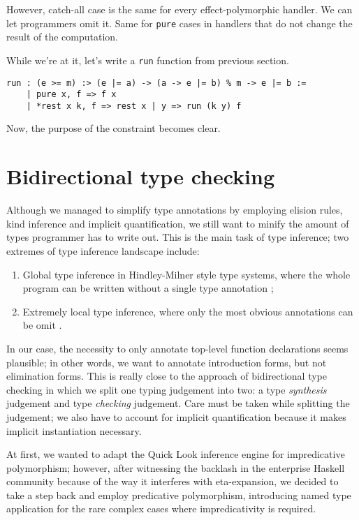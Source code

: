 \documentclass[a4paper,14pt]{extreport}
\begin{document}
However, catch-all case is the same for every effect-polymorphic handler. We can
let programmers omit it. Same for \verb|pure| cases in handlers that do not
change the result of the computation.

While we're at it, let's write a \verb|run| function from previous section.

\begin{verbatim}
run : (e >= m) :> (e |= a) -> (a -> e |= b) % m -> e |= b :=
    | pure x, f => f x
    | *rest x k, f => rest x | y => run (k y) f
\end{verbatim}

Now, the purpose of the constraint becomes clear.

\section{Bidirectional type checking}

Although we managed to simplify type annotations by employing elision rules,
kind inference and implicit quantification, we still want to minify the amount
of types programmer has to write out. This is the main task of type inference;
two extremes of type inference landscape include:

\begin{enumerate}
    \item Global type inference in Hindley-Milner style type systems, where the
        whole program can be written without a single type annotation
        \cite{milner};
    \item Extremely local type inference, where only the most obvious
        annotations can be omit \cite{go}.
\end{enumerate}

In our case, the necessity to only annotate top-level function declarations
seems plausible; in other words, we want to annotate introduction forms, but not
elimination forms. This is really close to the approach of bidirectional type
checking \cite{bidirectional} in which we split one typing judgement into two: a
type \textit{synthesis} judgement and type \textit{checking} judgement. Care
must be taken while splitting the judgement; we also have to account for
implicit quantification because it makes implicit instantiation necessary.

At first, we wanted to adapt the Quick Look inference engine \cite{quick-look}
for impredicative polymorphism; however, after witnessing the backlash
\cite{ql-backlash} in the enterprise Haskell community because of the way it
interferes with eta-expansion, we decided to take a step back and employ
predicative polymorphism, introducing named type application for the rare
complex cases where impredicativity is required.
\end{document}

